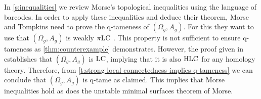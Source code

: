 In \cref{s:inequalities} we review Morse's topological inequalities using the language of barcodes.
In order to apply these inequalities and deduce their theorem, Morse and Tompkins need to prove the \mbox{q-tameness} of $(\Omega_g, A_g)$. 
For this they want to use that $(\Omega_g, A_g)$ is weakly $\pi\mathrm{LC}$ \cite[p.431]{Morse.1940}. This property is not sufficient to ensure q-tameness as \cref{thm:counterexample} demonstrates.
However, the proof given in \cite[p.464]{Morse.1939} establishes that $(\Omega_g, A_g)$ is $\mathrm{LC}$, implying that it is also $\mathrm{HLC}$ for any homology theory.
Therefore, from \cref{t:strong local connectedness implies q-tameness} we can conclude that $(\Omega_g, A_g)$ is q-tame as claimed.
This implies that Morse inequalities hold as does the unstable minimal surfaces theorem of Morse.





